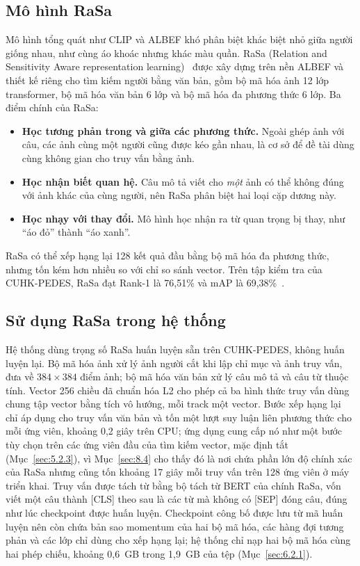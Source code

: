 \subsection{Mô hình RaSa}
\label{sec:3.5.3}

Mô hình tổng quát như CLIP và ALBEF khó phân biệt khác biệt nhỏ giữa người giống nhau, như cùng áo khoác nhưng khác màu quần. RaSa (Relation and Sensitivity Aware representation learning)~\cite{bai2023rasa} được xây dựng trên nền ALBEF và thiết kế riêng cho tìm kiếm người bằng văn bản, gồm bộ mã hóa ảnh 12 lớp transformer, bộ mã hóa văn bản 6 lớp và bộ mã hóa đa phương thức 6 lớp. Ba điểm chính của RaSa:
\begin{itemize}
    \item \textbf{Học tương phản trong và giữa các phương thức.} Ngoài ghép ảnh với câu, các ảnh cùng một người cũng được kéo gần nhau, là cơ sở để đề tài dùng cùng không gian cho truy vấn bằng ảnh.
    \item \textbf{Học nhận biết quan hệ.} Câu mô tả viết cho \emph{một} ảnh có thể không đúng với ảnh khác của cùng người, nên RaSa phân biệt hai loại cặp dương này.
    \item \textbf{Học nhạy với thay đổi.} Mô hình học nhận ra từ quan trọng bị thay, như ``áo đỏ'' thành ``áo xanh''.
\end{itemize}
RaSa có thể xếp hạng lại 128 kết quả đầu bằng bộ mã hóa đa phương thức, nhưng tốn kém hơn nhiều so với chỉ so sánh vector. Trên tập kiểm tra của CUHK-PEDES, RaSa đạt Rank-1 là 76,51\% và mAP là 69,38\%~\cite{bai2023rasa}.

\subsection{Sử dụng RaSa trong hệ thống}
\label{sec:3.5.4}

Hệ thống dùng trọng số RaSa huấn luyện sẵn trên CUHK-PEDES, không huấn luyện lại. Bộ mã hóa ảnh xử lý ảnh người cắt khi lập chỉ mục và ảnh truy vấn, đưa về $384 \times 384$ điểm ảnh; bộ mã hóa văn bản xử lý câu mô tả và câu từ thuộc tính. Vector 256 chiều đã chuẩn hóa L2 cho phép cả ba hình thức truy vấn dùng chung tập vector bằng tích vô hướng, mỗi track một vector. Bước xếp hạng lại chỉ áp dụng cho truy vấn văn bản và tốn một lượt suy luận liên phương thức cho mỗi ứng viên, khoảng 0,2 giây trên CPU; ứng dụng cung cấp nó như một bước tùy chọn trên các ứng viên đầu của tìm kiếm vector, mặc định tắt (Mục~\ref{sec:5.2.3}), vì Mục~\ref{sec:8.4} cho thấy đó là nơi chứa phần lớn độ chính xác của RaSa nhưng cũng tốn khoảng 17 giây mỗi truy vấn trên 128 ứng viên ở máy triển khai. Truy vấn được tách từ bằng bộ tách từ BERT của chính RaSa, vốn viết một câu thành [CLS] theo sau là các từ mà không có [SEP] đóng câu, đúng như lúc checkpoint được huấn luyện. Checkpoint công bố được lưu từ mã huấn luyện nên còn chứa bản sao momentum của hai bộ mã hóa, các hàng đợi tương phản và các lớp chỉ dùng cho xếp hạng lại; hệ thống chỉ nạp hai bộ mã hóa cùng hai phép chiếu, khoảng 0,6~GB trong 1,9~GB của tệp (Mục~\ref{sec:6.2.1}).

